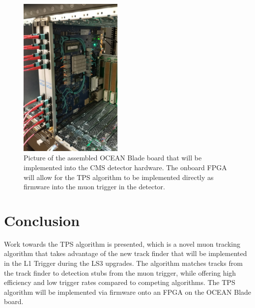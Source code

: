 \begin{figure}[htbp]
  \centering
  \includegraphics[width=0.45\textwidth]{fig/TPS/ocean.pdf}
  \caption{
    Picture of the assembled OCEAN Blade board that will be implemented into the CMS detector hardware.
    The onboard FPGA will allow for the TPS algorithm to be implemented directly as firmware into the muon trigger in the detector.
  }
  \label{fig:ocean}
\end{figure}

\section{Conclusion}

Work towards the TPS algorithm is presented, which is a novel muon tracking algorithm that takes advantage of the new track finder that will be implemented in the L1 Trigger during the LS3 upgrades.
The algorithm matches tracks from the track finder to detection stubs from the muon trigger, while offering high efficiency and low trigger rates compared to competing algorithms.
The TPS algorithm will be implemented via firmware onto an FPGA on the OCEAN Blade board.
